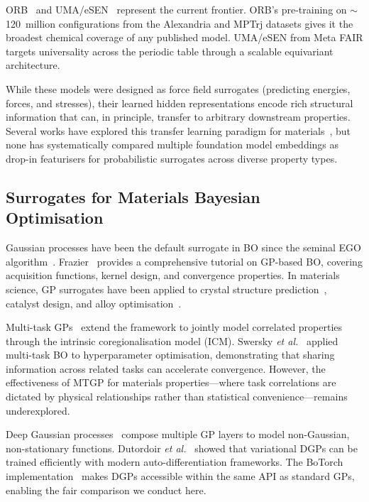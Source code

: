 ORB~\cite{orb2024} and UMA/eSEN~\cite{uma2025} represent the current frontier.
ORB's pre-training on $\sim$120~million configurations from the Alexandria and MPTrj datasets gives it the broadest chemical coverage of any published model.
UMA/eSEN from Meta FAIR targets universality across the periodic table through a scalable equivariant architecture.

While these models were designed as force field surrogates (predicting energies, forces, and stresses), their learned hidden representations encode rich structural information that can, in principle, transfer to arbitrary downstream properties.
Several works have explored this transfer learning paradigm for materials~\cite{yamada2019predicting}, but none has systematically compared multiple foundation model embeddings as drop-in featurisers for probabilistic surrogates across diverse property types.


\subsection{Surrogates for Materials Bayesian Optimisation}

Gaussian processes have been the default surrogate in BO since the seminal EGO algorithm~\cite{jones1998efficient}.
Frazier~\cite{frazier2018tutorial} provides a comprehensive tutorial on GP-based BO, covering acquisition functions, kernel design, and convergence properties.
In materials science, GP surrogates have been applied to crystal structure prediction~\cite{todorovic2019bayesian}, catalyst design, and alloy optimisation~\cite{wen2019machine}.

Multi-task GPs~\cite{bonilla2007multi} extend the framework to jointly model correlated properties through the intrinsic coregionalisation model (ICM).
Swersky \emph{et al.}~\cite{swersky2013multi} applied multi-task BO to hyperparameter optimisation, demonstrating that sharing information across related tasks can accelerate convergence.
However, the effectiveness of MTGP for materials properties---where task correlations are dictated by physical relationships rather than statistical convenience---remains underexplored.

Deep Gaussian processes~\cite{damianou2013deep} compose multiple GP layers to model non-Gaussian, non-stationary functions.
Dutordoir \emph{et al.}~\cite{dutordoir2021deep} showed that variational DGPs can be trained efficiently with modern auto-differentiation frameworks.
The BoTorch implementation~\cite{balandat2020botorch} makes DGPs accessible within the same API as standard GPs, enabling the fair comparison we conduct here.


